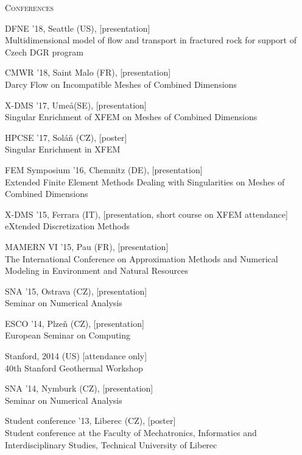 \documentclass[bibliography=totocnumbered,dvipsnames,FM,Dis, EN]{tulthesis_autoreferat}
\begin{document}
\vspace{0.5cm}
%
{\noindent\large\textsc{Conferences}}
%
\begin{itemize}[label={}, leftmargin=*]
{\small
\item DFNE '18, Seattle (US), [presentation] \\ Multidimensional model of flow and transport in fractured
rock for support of Czech DGR program
\item CMWR '18, Saint Malo (FR), [presentation] \\ Darcy Flow on Incompatible Meshes of
Combined Dimensions
\item X-DMS '17, Ume\aa (SE), [presentation] \\ Singular Enrichment of XFEM on Meshes of
Combined Dimensions
\item HPCSE '17, Sol\'a{\v n} (CZ), [poster] \\ Singular Enrichment in XFEM
\item FEM Symposium '16, Chemnitz (DE), [presentation] \\ Extended Finite Element Methods Dealing with Singularities on Meshes of Combined Dimensions
\item X-DMS '15, Ferrara (IT), [presentation, short course on XFEM attendance]\\ eXtended Discretization Methods
\item MAMERN VI '15, Pau (FR), [presentation] \\ The International Conference on Approximation Methods and Numerical Modeling in Environment and Natural Resources
\item SNA '15, Ostrava (CZ), [presentation] \\ Seminar on Numerical Analysis
\item ESCO '14, Plze{\v n} (CZ), [presentation] \\ European Seminar on Computing
\item Stanford, 2014 (US) [attendance only] \\ 40th Stanford Geothermal Workshop
\item SNA '14, Nymburk (CZ), [presentation] \\ Seminar on Numerical Analysis
\item Student conference '13, Liberec (CZ), [poster] \\
Student conference at the Faculty of Mechatronics, Informatics and Interdisciplinary Studies, Technical University of Liberec
}
\end{itemize}




\newpage
{\small

% 

}
\end{document}
